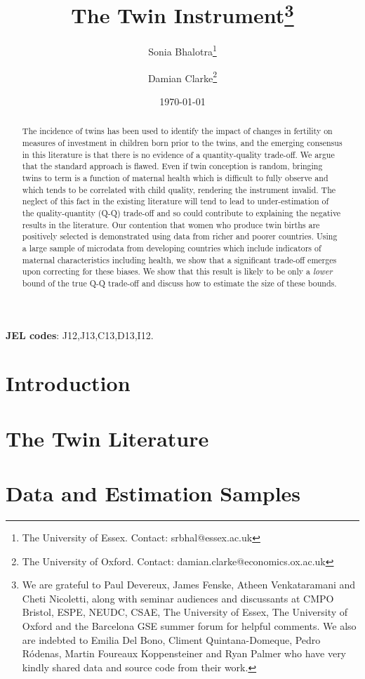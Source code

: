 \documentclass{article}[11pt,subeqn]
\title{The Twin Instrument\footnote{We are grateful to Paul Devereux, 
James Fenske, Atheen Venkataramani and Cheti Nicoletti, along with 
seminar audiences and discussants at CMPO Bristol, ESPE, NEUDC, CSAE, The 
University of Essex, The University of Oxford and the Barcelona GSE summer forum 
for helpful comments.  We also are indebted to Emilia Del Bono, Climent 
Quintana-Domeque, Pedro R\'odenas, Martin Foureaux Koppensteiner and Ryan Palmer 
who have very kindly shared data and source code from their work.}}
\author{Sonia Bhalotra\thanks{The University of Essex.  
Contact: srbhal@essex.ac.uk} 
\and Damian Clarke\thanks{The University of Oxford. 
Contact: damian.clarke@economics.ox.ac.uk}}
\date{\today}
\begin{document}
\begin{spacing}{1.4}

\maketitle
\begin{abstract}
 The incidence of twins has been used to identify the impact of changes in 
 fertility on measures of investment in children born prior to the twins, and
 the emerging consensus in this literature is that there is no evidence of a
 quantity-quality trade-off. We argue that the standard approach is flawed.
 Even if twin conception is random, bringing twins to term is a function of
 maternal health which is difficult to fully observe and which tends to be
 correlated with child quality, rendering the instrument invalid. The neglect
 of this fact in the existing literature will tend to lead to
 under-estimation of the quality-quantity (Q-Q) trade-off and so could
 contribute to explaining the negative results in the literature. Our contention
 that women who produce twin births are positively selected is demonstrated using
 data from richer and poorer countries. Using a large sample of microdata from
 developing countries which include indicators of maternal characteristics
 including health, we show that a significant trade-off emerges upon correcting
 for these biases. We show that this result is likely to be only a \emph{lower}
 bound of the true Q-Q trade-off and discuss how to estimate the size of these
 bounds.
 \\
\end{abstract}
\hspace{4mm}\textbf{\small JEL codes}: J12,J13,C13,D13,I12. \\

\newpage
\section{Introduction}                             \label{TWINscn:intro}
\section{The Twin Literature}                      \label{TWINscn:literature}
\section{Data and Estimation Samples}              \label{TWINscn:data}

\end{spacing}
\end{document}
